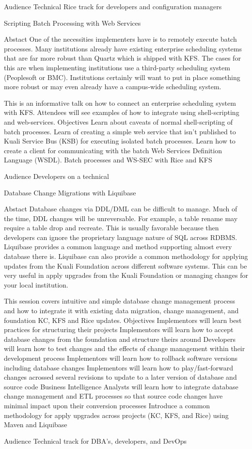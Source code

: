 \documentclass[12pt,notitlepage]{article}
\begin{document}
Audience
Technical Rice track for developers and configuration managers

Scripting Batch Processing with Web Services

Abstact
One of the necessities implementers have is to remotely execute batch processes. Many institutions already have existing enterprise scheduling systems that are far more robust than Quartz which is shipped with KFS. The cases for this are when implementing institutions use a third-party scheduling system (Peoplesoft or BMC). Institutions certainly will want to put in place something more robust or may even already have a campus-wide scheduling system.

This is an informative talk on how to connect an enterprise scheduling system with KFS. Attendees will see examples of how to integrate using shell-scripting and web-services.
Objectives
Learn about caveats of normal shell-scripting of batch processes.
Learn of creating a simple web service that isn't published to Kuali Service Bus (KSB) for executing isolated batch processes.
Learn how to create a client for communicating with the batch Web Services Definition Language (WSDL).
Batch processes and WS-SEC with Rice and KFS

Audience
Developers on a technical

Database Change Migrations with Liquibase

Abstact
Database changes via DDL/DML can be difficult to manage. Much of the time, DDL changes will be unreversable. For example, a table rename may require a table drop and recreate. This is usually favorable because then developers can ignore the proprietary language nature of SQL across RDBMS. Liquibase provides a common language and method supporting almost every database there is. Liquibase can also provide a common methodology for applying updates from the Kuali Foundation across different software systems. This can be very useful in apply upgrades from the Kuali Foundation or managing changes for your local institution.

This session covers intuitive and simple database change management process and how to integrate it with existing data migration, change management, and foundation KC, KFS and Rice updates.
Objectives
Implementors will learn best practices for structuring their projects
Implementors will learn how to accept database changes from the foundation and structure theirs around
Developers will learn how to test changes and the effects of change management within their development process
Implementors will learn how to rollback software versions including database changes
Implementors will learn how to play/fast-forward changes acrossed several revisions to update to a later version of database and source code
Business Intelligence Analysts will learn how to integrate database change management and ETL processes so that source code changes have minimal impact upon their conversion processes
Introduce a common methodology for apply upgrades across projects (KC, KFS, and Rice) using Maven and Liquibase

Audience
Technical track for DBA’s, developers, and DevOps
\end{document}
